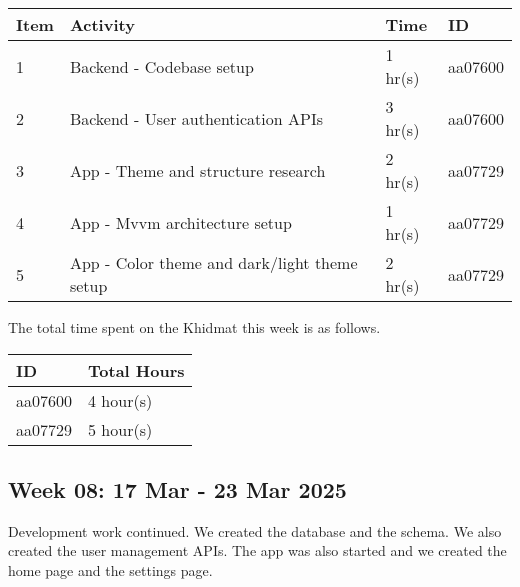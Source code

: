 \documentclass[12pt,a4paper]{article}
\begin{document}
\begin{center}
    \bigskip
    \begin{tabular}{|l|l|l|l|}
        \hline
        Item 	& Activity & Time & ID \\\hline\hline
        1	& Backend - Codebase setup & 1 hr(s) & aa07600 \\\hline
        2	& Backend - User authentication APIs & 3 hr(s) & aa07600 \\\hline\hline
        3	& App - Theme and structure research & 2 hr(s) & aa07729 \\\hline
        4	& App - Mvvm architecture setup & 1 hr(s) & aa07729 \\\hline
        5	& App - Color theme and dark/light theme setup & 2 hr(s) & aa07729 \\\hline
    \end{tabular}

    \bigskip
    The total time spent on the Khidmat this week is as follows.

    \bigskip
    \begin{tabular}{|l|l|}
        \hline
        ID & Total Hours\\\hline\hline
        aa07600 & 4 hour(s)\\\hline
        aa07729 & 5 hour(s)\\\hline
    \end{tabular}
\end{center}

\newpage

\subsection{Week 08: 17 Mar - 23 Mar 2025}
Development work continued. We created the database and the schema. We also created the user management APIs. The app was also started and we created the home page and the settings page.
\end{document}
